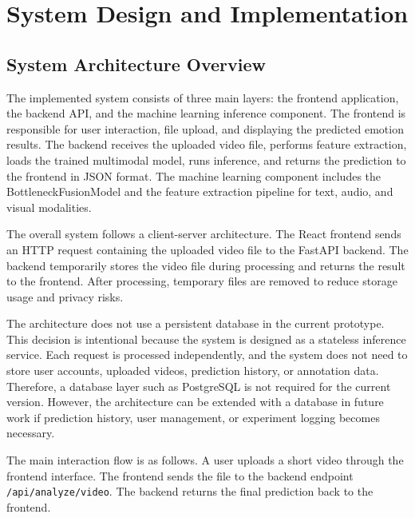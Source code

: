 
\chapter{System Design and Implementation}
\label{chap:system_design}

\setlength{\parskip}{1em}

\section{System Architecture Overview}

The implemented system consists of three main layers: the frontend application, the backend API, and the machine learning inference component. The frontend is responsible for user interaction, file upload, and displaying the predicted emotion results. The backend receives the uploaded video file, performs feature extraction, loads the trained multimodal model, runs inference, and returns the prediction to the frontend in JSON format. The machine learning component includes the BottleneckFusionModel and the feature extraction pipeline for text, audio, and visual modalities.

The overall system follows a client-server architecture. The React frontend sends an HTTP request containing the uploaded video file to the FastAPI backend. The backend temporarily stores the video file during processing and returns the result to the frontend. After processing, temporary files are removed to reduce storage usage and privacy risks.

The architecture does not use a persistent database in the current prototype. This decision is intentional because the system is designed as a stateless inference service. Each request is processed independently, and the system does not need to store user accounts, uploaded videos, prediction history, or annotation data. Therefore, a database layer such as PostgreSQL is not required for the current version. However, the architecture can be extended with a database in future work if prediction history, user management, or experiment logging becomes necessary.

The main interaction flow is as follows. A user uploads a short video through the frontend interface. The frontend sends the file to the backend endpoint \texttt{/api/analyze/video}. The backend returns the final prediction back to the frontend.

